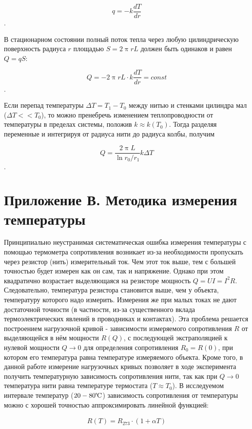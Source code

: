     \[q = - k \frac{dT}{dr}\].

    В стационарном состоянии полный поток тепла через любую цилиндрическую поверхность радиуса $r$ площадью $S = 2\uppi rL$ должен быть одинаков и равен $Q = qS$:

    \[Q = - 2\uppi rL \cdot k \frac{dT}{dr} = const\].

    Если перепад температуры $\Delta T = T_1 - T_0$ между нитью и стенками цилиндра мал ($\Delta T << T_0$), то можно пренебречь изменением теплопроводности от температуры в пределах системы, положив $k \approx k(T_0)$. Тогда разделяя переменные и интегрируя от радиуса нити до радиуса колбы, получим

    \[Q = \frac{2 \uppi L}{\ln{r_0/r_1}} k \Delta T\]. 

\section{Приложение В. Методика измерения температуры}

    Принципиально неустранимая систематическая ошибка измерения температуры с помощью термометра сопротивления возникает из-за необходимости пропускать через резистор (нить) измерительный ток. Чем этот ток выше, тем с большей точностью будет измерен как он сам, так и напряжение. Однако при этом квадратично возрастает выделяющаяся на  резисторе мощность $Q = UI = I^2R$. Следовательно, температура резистора становится выше, чем у объекта, температуру которого надо измерить. Измерения же при малых токах не дают достаточной точности (в частности, из-за существенного вклада термоэлектрических явлений в проводниках и контактах). Эта проблема решается построением нагрузочной кривой - зависимости измеряемого сопротивления $R$ от выделяющейся в нём мощности $R(Q)$, с последующей экстраполяцией к нулевой мощности $Q \to 0$ для определения сопротивления $R_0 = R(0)$, при котором его температура равна температуре измеряемого объекта. Кроме того, в данной работе измерение нагрузочных кривых позволяет в ходе эксперимента получить температурную зависимость сопротивления нити, так как при $Q \to 0$ температура нити равна температуре термостата ($T \approx T_0$). В исследуемом интервале температур ($20-80 \celsius$) зависимость сопротивления от температуры можно с хорошей точностью аппроксимировать линейной функцией:

    \begin{align}
        R(T) = R_{273} \cdot (1 + \alpha T) \label{RT}
    \end{align}

